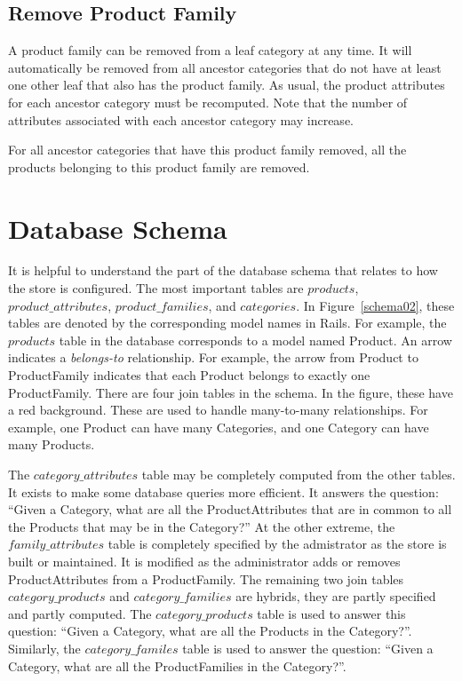 \documentclass[letterpaper, 12pt]{article}
\begin{document}
\subsection{Remove Product Family}
A product family can be removed from a leaf category at any time.  It will automatically be removed from all ancestor categories that do not have at least one other leaf that also has the product family.  As usual, the product attributes for each ancestor category must be recomputed.
Note that the number of attributes associated with each ancestor category may increase.
\par
For all ancestor categories that have this product family removed, all the products belonging to this product family are removed.

\section{Database Schema}
It is helpful to understand the part of the database schema that relates to how the store is configured.  The most important tables are $products$, $product\_attributes$, $product\_families$, and $categories$.  In Figure~\ref{schema02}, these tables are denoted by the corresponding model names in Rails.  For example, the $products$ table in the database corresponds to a model named Product.  An arrow indicates a \emph{belongs-to} relationship.  For example, the arrow from Product to ProductFamily indicates that each Product belongs to exactly one ProductFamily.  There are four join tables in the schema.  In the figure, these have a red background.  These are used to handle many-to-many relationships.  For example, one Product can have many Categories, and one Category can have many Products.  
\par
The $category\_attributes$ table may be completely computed from the other tables.  It exists to make some database queries more efficient.  It answers the question: ``Given a Category, what are all the ProductAttributes that are in common to all the Products that may be in the Category?''  At the other extreme, the $family\_attributes$ table is completely specified by the admistrator as the store is built or maintained.  It is modified as the administrator adds or removes ProductAttributes from a ProductFamily.  The remaining two join tables $category\_products$ and $category\_families$ are hybrids, they are partly specified and partly computed.  The $category\_products$ table is used to answer this question: ``Given a Category, what are all the Products in the Category?''.  Similarly, the $category\_familes$ table is used to answer the question: ``Given a Category, what are all the ProductFamilies in the Category?''.  
\end{document}
